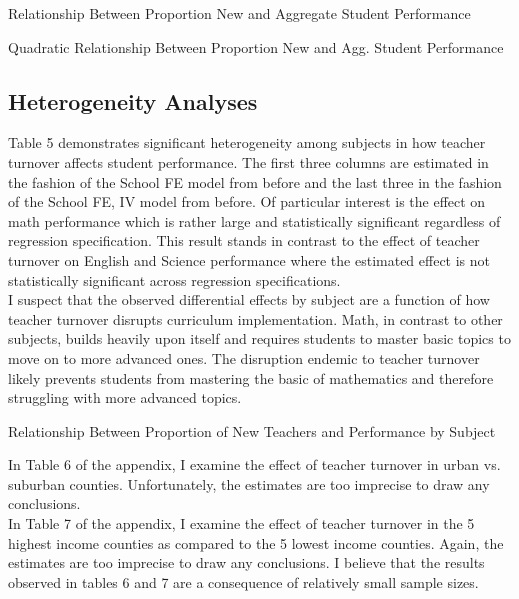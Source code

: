 \documentclass[12pt]{report}
\begin{document}
\begin{table}[!htb]
\caption{Relationship Between Proportion New and Aggregate Student Performance}
    \centering

\end{table}
\clearpage
\begin{table}[!htb]
\caption{Quadratic Relationship Between Proportion New and Agg. Student Performance}
    \centering

\end{table}

\subsection{Heterogeneity Analyses}
\noindent Table 5 demonstrates significant heterogeneity among subjects in how teacher turnover affects student performance. The first three columns are estimated in the fashion of the School FE model from before and the last three in the fashion of the School FE, IV model from before. Of particular interest is the effect on math performance which is rather large and statistically significant regardless of regression specification. This result stands in contrast to the effect of teacher turnover on English and Science performance where the estimated effect is not statistically significant across regression specifications. \\
\indent I suspect that the observed differential effects by subject are a function of how teacher turnover disrupts curriculum implementation. Math, in contrast to other subjects, builds heavily upon itself and requires students to master basic topics to move on to more advanced ones. The disruption endemic to teacher turnover likely prevents students from mastering the basic of mathematics and therefore struggling with more advanced topics.\\
\begin{table}[!htb]
\caption{Relationship Between Proportion of New Teachers and Performance by Subject}
    \centering

\end{table}
\clearpage
\indent In Table 6 of the appendix, I examine the effect of teacher turnover in urban vs. suburban counties. Unfortunately, the estimates are too imprecise to draw any conclusions.\\
\indent In Table 7 of the appendix, I examine the effect of teacher turnover in the 5 highest income counties as compared to the 5 lowest income counties. Again, the estimates are too imprecise to draw any conclusions. I believe that the results observed in tables 6 and 7 are a consequence of relatively small sample sizes.\\
\end{document}
